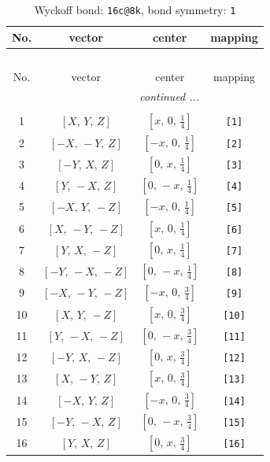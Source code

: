 \documentclass[fleqn,8pt]{jsarticle}
\begin{document}
\begin{longtable}{cccc}
\caption{Wyckoff bond: {\tt 16c@8k}, bond symmetry: {\tt 1}}
 \\
 \hline \hline
No. & vector & center & mapping \\ \hline \endfirsthead

\multicolumn{3}{l}{\tablename\ \thetable{}} \\
 \hline \hline
No. & vector & center & mapping \\ \hline \endhead

 \hline \hline
\multicolumn{3}{r}{\footnotesize\it continued ...} \\ \endfoot

 \hline \hline
\multicolumn{3}{r}{} \\ \endlastfoot

1 & $\left[ X,\, Y,\, Z \right]$ & $\left[ x,\, 0,\, \frac{1}{4} \right]$ & {\tt [1]} \\ \hline
2 & $\left[ - X,\, - Y,\, Z \right]$ & $\left[ - x,\, 0,\, \frac{1}{4} \right]$ & {\tt [2]} \\ \hline
3 & $\left[ - Y,\, X,\, Z \right]$ & $\left[ 0,\, x,\, \frac{1}{4} \right]$ & {\tt [3]} \\ \hline
4 & $\left[ Y,\, - X,\, Z \right]$ & $\left[ 0,\, - x,\, \frac{1}{4} \right]$ & {\tt [4]} \\ \hline
5 & $\left[ - X,\, Y,\, - Z \right]$ & $\left[ - x,\, 0,\, \frac{1}{4} \right]$ & {\tt [5]} \\ \hline
6 & $\left[ X,\, - Y,\, - Z \right]$ & $\left[ x,\, 0,\, \frac{1}{4} \right]$ & {\tt [6]} \\ \hline
7 & $\left[ Y,\, X,\, - Z \right]$ & $\left[ 0,\, x,\, \frac{1}{4} \right]$ & {\tt [7]} \\ \hline
8 & $\left[ - Y,\, - X,\, - Z \right]$ & $\left[ 0,\, - x,\, \frac{1}{4} \right]$ & {\tt [8]} \\ \hline
9 & $\left[ - X,\, - Y,\, - Z \right]$ & $\left[ - x,\, 0,\, \frac{3}{4} \right]$ & {\tt [9]} \\ \hline
10 & $\left[ X,\, Y,\, - Z \right]$ & $\left[ x,\, 0,\, \frac{3}{4} \right]$ & {\tt [10]} \\ \hline
11 & $\left[ Y,\, - X,\, - Z \right]$ & $\left[ 0,\, - x,\, \frac{3}{4} \right]$ & {\tt [11]} \\ \hline
12 & $\left[ - Y,\, X,\, - Z \right]$ & $\left[ 0,\, x,\, \frac{3}{4} \right]$ & {\tt [12]} \\ \hline
13 & $\left[ X,\, - Y,\, Z \right]$ & $\left[ x,\, 0,\, \frac{3}{4} \right]$ & {\tt [13]} \\ \hline
14 & $\left[ - X,\, Y,\, Z \right]$ & $\left[ - x,\, 0,\, \frac{3}{4} \right]$ & {\tt [14]} \\ \hline
15 & $\left[ - Y,\, - X,\, Z \right]$ & $\left[ 0,\, - x,\, \frac{3}{4} \right]$ & {\tt [15]} \\ \hline
16 & $\left[ Y,\, X,\, Z \right]$ & $\left[ 0,\, x,\, \frac{3}{4} \right]$ & {\tt [16]} \\
\end{longtable}
\end{document}
